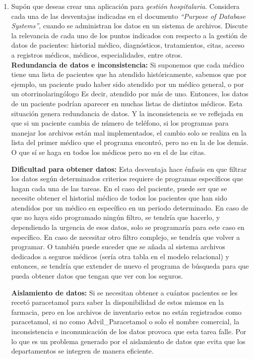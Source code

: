 \documentclass[12pt]{report}
\begin{document}
\begin{enumerate}[label=\textbf{\arabic*.}, leftmargin=*]
\begin{enumerate}[label=\textbf{\alph*.}, leftmargin=*, itemsep=1.0em]
\begin{itemize}
\end{itemize}

\item Sup\'on que deseas crear una aplicaci\'on para \textit{gesti\'on hospitalaria}. Considera cada una de las desventajas indicadas en el documento \textit{``Purpose of Database Systems''}, cuando se administran los datos en un sistema de archivos. Discute la relevancia de cada uno de los puntos indicados con respecto a la gesti\'on de datos de pacientes: historial m\'edico, diagn\'osticos, tratamientos, citas, acceso a registros m\'edicos, m\'edicos, especialidades, entre otros.\\

    \textbf{Redundancia de datos e inconsistencia:}
    Si suponemos que cada médico tiene una lista de pacientes que ha atendido históricamente, sabemos que por ejemplo, un paciente pudo haber sido atendido por un médico general, o por un otorrinolaringólogo Es decir, atendido por más de uno.
    Entonces, los datos de un paciente podrían aparecer en muchas listas de distintos médicos. Esta situación genera redundancia de datos. Y la inconsistencia se ve reflejada en que si un paciente cambia de número de teléfono, si los programas para manejar los archivos están mal implementados, el cambio solo se realiza en la lista del primer médico que el programa encontró, pero no en la de los demás. O que sí se haga en todos los médicos pero no en el de las citas.

    \textbf{Dificultad para obtener datos:}
    Esta desventaja hace énfasis en que filtrar los datos según determinados criterios requiere de programas específicos que hagan cada una de las tareas.
    En el caso del paciente, puede ser que se necesite obtener el historial médico de todos los pacientes que han sido atendidos por un médico en específico en un periodo determinado. En caso de que no haya sido programado ningún filtro, se tendría que hacerlo, y dependiendo la urgencia de esos datos, solo se programaría para este caso en específico. En caso de necesitar otro filtro complejo, se tendría que volver a programar. O también puede suceder que se añada al sistema archivos dedicados a seguros médicos (sería otra tabla en el modelo relacional) y entonces, se tendría que extender de nuevo el programa de búsqueda para que pueda obtener datos que tengan que ver con los seguros.

    \textbf{Aislamiento de datos:}
    Si se necesitan obtener a cuántos pacientes se les recetó paracetamol para saber la disponibilidad de estos mismos en la farmacia, pero en los archivos de inventario estos no están registrados como paracetamol, si no como Advil\_Paracetamol o solo el nombre comercial, la inconsistencia e incomunicación de los datos provoca que esta tarea falle. Por lo que es un problema generado por el aislamiento de datos que evita que los departamentos se integren de manera eficiente.



\end{enumerate}
\end{enumerate}
\end{document}
